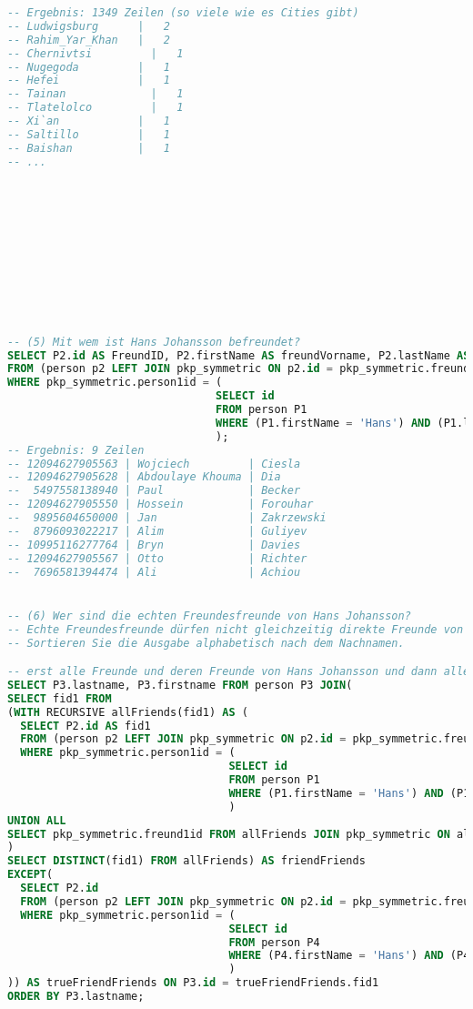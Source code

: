 \begin{lstlisting}[language=sql]
-- Ergebnis: 1349 Zeilen (so viele wie es Cities gibt)
-- Ludwigsburg      |   2
-- Rahim_Yar_Khan   |   2
-- Chernivtsi	      |   1
-- Nugegoda	        |   1
-- Hefei            |   1
-- Tainan	          |   1
-- Tlatelolco	      |   1
-- Xi`an            |   1
-- Saltillo	        |   1
-- Baishan	        |   1
-- ...











-- (5) Mit wem ist Hans Johansson befreundet?
SELECT P2.id AS FreundID, P2.firstName AS freundVorname, P2.lastName AS freundNachname
FROM (person p2 LEFT JOIN pkp_symmetric ON p2.id = pkp_symmetric.freund1id)
WHERE pkp_symmetric.person1id = (
                                SELECT id
                                FROM person P1
                                WHERE (P1.firstName = 'Hans') AND (P1.lastName = 'Johansson')
                                );
-- Ergebnis: 9 Zeilen
-- 12094627905563 | Wojciech         | Ciesla
-- 12094627905628 | Abdoulaye Khouma | Dia
--  5497558138940 | Paul             | Becker
-- 12094627905550 | Hossein          | Forouhar
--  9895604650000 | Jan              | Zakrzewski
--  8796093022217 | Alim             | Guliyev
-- 10995116277764 | Bryn             | Davies
-- 12094627905567 | Otto             | Richter
--  7696581394474 | Ali              | Achiou


-- (6) Wer sind die echten Freundesfreunde von Hans Johansson?
-- Echte Freundesfreunde dürfen nicht gleichzeitig direkte Freunde von Hans Johansson sein.
-- Sortieren Sie die Ausgabe alphabetisch nach dem Nachnamen.

-- erst alle Freunde und deren Freunde von Hans Johansson und dann alle direkten (siehe 5) abziehen
SELECT P3.lastname, P3.firstname FROM person P3 JOIN(
SELECT fid1 FROM
(WITH RECURSIVE allFriends(fid1) AS (
  SELECT P2.id AS fid1
  FROM (person p2 LEFT JOIN pkp_symmetric ON p2.id = pkp_symmetric.freund1id)
  WHERE pkp_symmetric.person1id = (
                                  SELECT id
                                  FROM person P1
                                  WHERE (P1.firstName = 'Hans') AND (P1.lastName = 'Johansson')
                                  )
UNION ALL
SELECT pkp_symmetric.freund1id FROM allFriends JOIN pkp_symmetric ON allFriends.fid1=pkp_symmetric.person1id
)
SELECT DISTINCT(fid1) FROM allFriends) AS friendFriends
EXCEPT(
  SELECT P2.id
  FROM (person p2 LEFT JOIN pkp_symmetric ON p2.id = pkp_symmetric.freund1id)
  WHERE pkp_symmetric.person1id = (
                                  SELECT id
                                  FROM person P4
                                  WHERE (P4.firstName = 'Hans') AND (P4.lastName = 'Johansson')
                                  )
)) AS trueFriendFriends ON P3.id = trueFriendFriends.fid1
ORDER BY P3.lastname;


\end{lstlisting}
